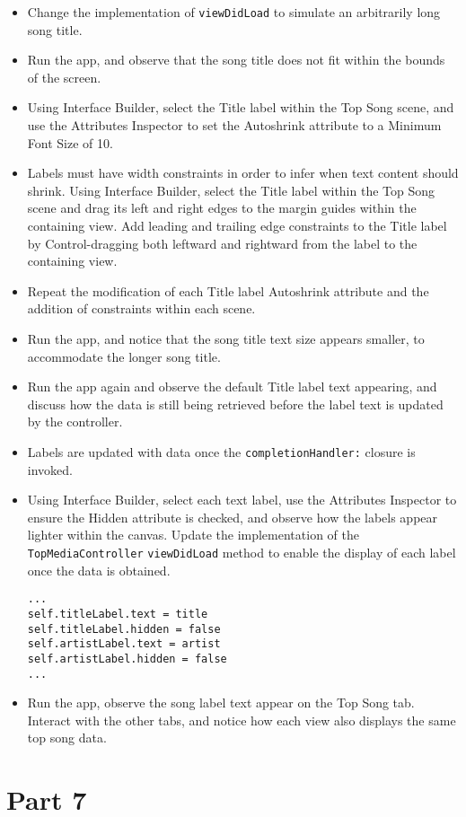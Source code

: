 \documentclass[a4paper,11pt]{scrartcl}
\begin{document}
\begin{itemize}
\item Change the implementation of \texttt{viewDidLoad} to simulate an arbitrarily long song title.
\item Run the app, and observe that the song title does not fit within the bounds of the screen.
\item Using Interface Builder, select the Title label within the Top Song scene, and use the Attributes Inspector to set the Autoshrink attribute to a Minimum Font Size of 10. 
\item Labels must have width constraints in order to infer when text content should shrink. Using Interface Builder, select the Title label within the Top Song scene and drag its left and right edges to the margin guides within the containing view. Add leading and trailing edge constraints to the Title label by Control-dragging both leftward and rightward from the label to the containing view.
\item Repeat the modification of each Title label Autoshrink attribute and the addition of constraints within each scene.
\item Run the app, and notice that the song title text size appears smaller, to accommodate the longer song title.
\item Run the app again and observe the default Title label text appearing, and discuss how the data is still being retrieved before the label text is updated by the controller.
\item Labels are updated with data once the \texttt{completionHandler:} closure is invoked.
\item Using Interface Builder, select each text label, use the Attributes Inspector to ensure the Hidden attribute is checked, and observe how the labels appear lighter within the canvas. Update the implementation of the \texttt{TopMediaController} \texttt{viewDidLoad} method to enable the display of each label once the data is obtained.
\begin{lstlisting}
...
self.titleLabel.text = title
self.titleLabel.hidden = false
self.artistLabel.text = artist
self.artistLabel.hidden = false
...
\end{lstlisting}
\item Run the app, observe the song label text appear on the Top Song tab. Interact with the other tabs, and notice how each view also displays the same top song data.
\end{itemize}

\section*{Part 7}
\end{document}
